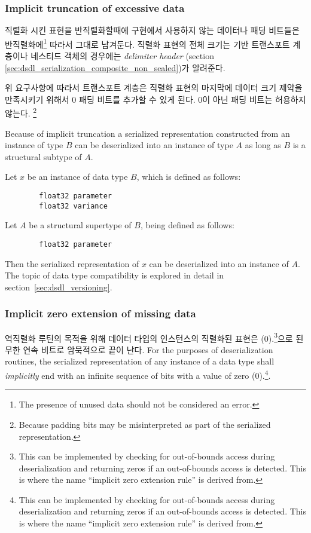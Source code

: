 \subsubsection{Implicit truncation of excessive data}\label{sec:dsdl_serialization_implicit_truncation}

직렬화 시킨 표현을 반직렬화할때에 구현에서 사용하지 않는 데이터나 패딩 비트들은 반직렬화에\footnote{%
The presence of unused data should not be considered an error.
} 따라서 그대로 남겨둔다.
직렬화 표현의 전체 크기는 기반 트랜스포트 계층이나 네스티드 객체의 경우에는 \emph{delimiter header}
(section \ref{sec:dsdl_serialization_composite_non_sealed})가 알려준다.

위 요구사항에 따라서 트랜스포트 계층은 직렬화 표현의 마지막에 데이터 크기 제약을 만족시키기 위해서 0 패딩 비트를 추가할 수 있게 된다.
0이 아닌 패딩 비트는 허용하지 않는다. \footnote{%
    Because padding bits may be misinterpreted as part of the serialized representation.
}

\begin{remark}
    Because of implicit truncation a serialized representation constructed from an instance of type $B$ can be
    deserialized into an instance of type $A$ as long as $B$ is a structural subtype of $A$.

    Let $x$ be an instance of data type $B$, which is defined as follows:

    \begin{verbatim}
        float32 parameter
        float32 variance
    \end{verbatim}

    Let $A$ be a structural supertype of $B$, being defined as follows:

    \begin{verbatim}
        float32 parameter
    \end{verbatim}

    Then the serialized representation of $x$ can be deserialized into an instance of $A$.
    The topic of data type compatibility is explored in detail in section~\ref{sec:dsdl_versioning}.
\end{remark}

\subsubsection{Implicit zero extension of missing data}\label{sec:dsdl_serialization_implicit_zero_extension}

역직렬화 루틴의 목적을 위해
데이터 타입의 인스턴스의 직렬화된 표현은 (0).\footnote{%
    This can be implemented by checking for out-of-bounds access during deserialization and returning zeros
    if an out-of-bounds access is detected. This is where the name ``implicit zero extension rule'' is derived
    from.
}으로 된 무한 연속 비트로 암묵적으로 끝이 난다.
For the purposes of deserialization routines,
the serialized representation of any instance of a data type shall \emph{implicitly} end with an
infinite sequence of bits with a value of zero (0).\footnote{%
    This can be implemented by checking for out-of-bounds access during deserialization and returning zeros
    if an out-of-bounds access is detected. This is where the name ``implicit zero extension rule'' is derived
    from.
}.

